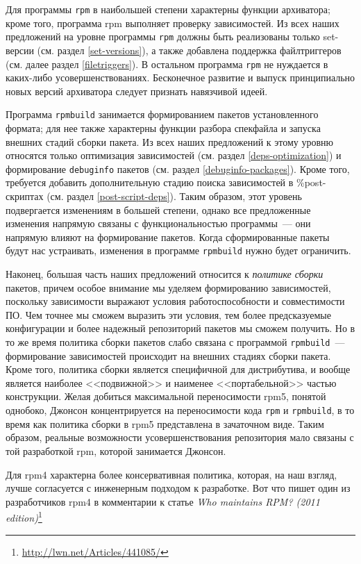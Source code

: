 \documentclass[russian,a4paper,12pt,titlepage]{article}
\begin{document}
Для программы \verb|rpm| в наибольшей степени характерны функции архиватора; кроме того, программа rpm выполняет проверку
зависимостей.  Из всех наших предложений на уровне программы \verb|rpm| должны быть реализованы только set-версии
(см. раздел \ref{set-versions}), а также добавлена поддержка файлтриггеров (см. далее раздел \ref{filetriggers}).
В остальном программа \verb|rpm| не нуждается в каких-либо усовершенствованиях.  Бесконечное развитие и выпуск
принципиально новых версий архиватора следует признать навязчивой идеей.

Программа \verb|rpmbuild| занимается формированием пакетов установленного формата; для нее также характерны
функции разбора спекфайла и запуска внешних стадий сборки пакета.  Из всех наших предложений к этому уровню
относятся только оптимизация зависимостей (см. раздел \ref{deps-optimization}) и формирование \verb|debuginfo| пакетов
(см. раздел \ref{debuginfo-packages}).  Кроме того, требуется добавить дополнительную стадию поиска зависимостей в
\%post-скриптах (см. раздел \ref{post-script-deps}).  Таким образом, этот уровень подвергается изменениям в большей
степени, однако все предложенные изменения напрямую связаны с функциональностью программы~--- они напрямую влияют
на формирование пакетов.  Когда сформированные пакеты будут нас устраивать, изменения в программе \verb|rpmbuild|
нужно будет ограничить.

Наконец, большая часть наших предложений относится к \emph{политике сборки} пакетов, причем особое внимание
мы уделяем формированию зависимостей, поскольку зависимости выражают условия работоспособности и совместимости ПО.
Чем точнее мы сможем выразить эти условия, тем более предсказуемые конфигурации и более надежный репозиторий пакетов
мы сможем получить.  Но в то же время политика сборки пакетов слабо связана
с программой \verb|rpmbuild|~--- формирование зависимостей происходит на внешних стадиях сборки пакета.  Кроме того,
политика сборки является специфичной для дистрибутива, и вообще является наиболее <<подвижной>> и наименее <<портабельной>>
частью конструкции.  Желая добиться максимальной переносимости rpm5, понятой однобоко, Джонсон концентрируется
на переносимости кода \verb|rpm| и \verb|rpmbuild|, в то время как политика сборки в rpm5 представлена в зачаточном виде.
Таким образом, реальные возможности усовершенствования репозитория мало связаны с той разработкой rpm,
которой занимается Джонсон.

Для rpm4 характерна более консервативная политика, которая, на наш взгляд, лучше согласуется с инженерным подходом
к разработке.  Вот что пишет один из разработчиков rpm4 в комментарии к статье \textsl{Who maintains RPM?
(2011 edition)}\footnote{\url{http://lwn.net/Articles/441085/}}
\end{document}
